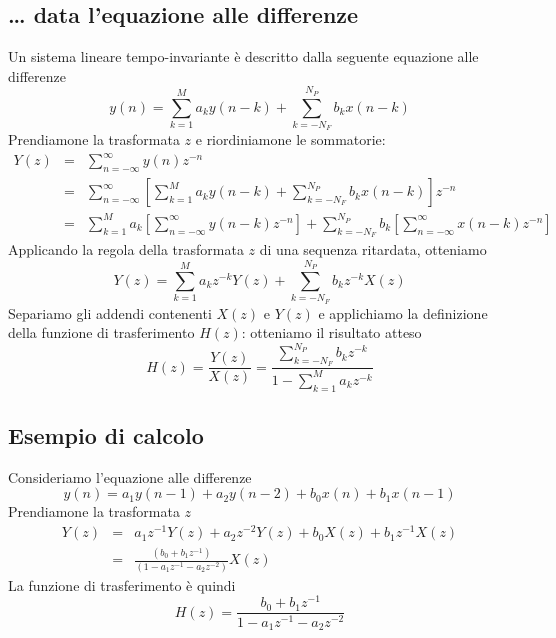 \subsection*{\ldots\textrm{} data l'equazione alle differenze}
Un sistema lineare tempo-invariante \`e descritto dalla seguente equazione alle differenze
\begin{displaymath}
y(n)=\sum_{k=1}^M a_k y(n-k) + \sum_{k=-N_F}^{N_P}b_k x(n-k)
\end{displaymath}
Prendiamone la trasformata $z$ e riordiniamone le sommatorie:
\begin{eqnarray*}
Y(z) & = & \sum_{n=-\infty}^{\infty} y(n)z^{-n} \\
     & = & \sum_{n=-\infty}^{\infty} \left [ \sum_{k=1}^M a_k y(n-k) + \sum_{k=-N_F}^{N_P} b_k x(n-k) \right] z^{-n} \\
     & = & \sum_{k=1}^M a_k \left [ \sum_{n=-\infty}^{\infty} y(n-k)z^{-n}\right ] + \sum_{k=-N_F}^{N_P} b_k \left [ \sum_{n=-\infty}^{\infty} x(n-k)z^{-n}\right ]
\end{eqnarray*}
Applicando la regola della trasformata $z$ di una sequenza ritardata, otteniamo
\begin{displaymath}
Y(z)=\sum_{k=1}^M a_k z^{-k}Y(z) + \sum_{k=-N_F}^{N_P} b_k z^{-k} X(z)
\end{displaymath}
Separiamo gli addendi contenenti $X(z)$ e $Y(z)$ e applichiamo la definizione della funzione di trasferimento $H(z)$: otteniamo il risultato atteso
\begin{displaymath}
H(z)=\frac{Y(z)}{X(z)}=\frac{\sum_{k=-{N_F}}^{N_P} b_k z^{-k}}{1- \sum_{k=1}^M a_k z^{-k}}
\end{displaymath}

\subsection*{Esempio di calcolo}
Consideriamo l'equazione alle differenze \\
\begin{displaymath}
y(n)=a_1 y(n-1)+a_2 y(n-2)+b_0 x(n)+b_1 x(n-1)
\end{displaymath}
Prendiamone la trasformata $z$
\begin{eqnarray*}
Y(z) & = & a_1z^{-1}Y(z)+a_2z^{-2}Y(z)+b_0 X(z)+b_1 z^{-1}X(z) \\
     & = & \frac{(b_0 + b_1 z^{-1})}{(1-a_1 z^{-1}-a_2 z^{-2})}X(z)
\end{eqnarray*}
La funzione di trasferimento \`e quindi 
\begin{displaymath}
H(z)=\frac{b_0 + b_1 z^{-1}}{1-a_1 z^{-1} -a_2 z^{-2}}
\end{displaymath}

